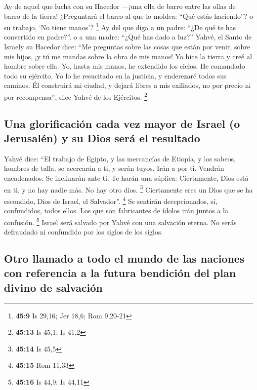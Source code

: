 \begin{paracol}{2}
 Ay de aquel que lucha con su Hacedor ---¡una olla de
barro entre las ollas de barro de la tierra! ¿Preguntará el barro al que
lo moldea: ``Qué estás haciendo''? o su trabajo, `No tiene manos'?
\footnote{\textbf{45:9} Is 29,16; Jer 18,6; Rom 9,20-21} 
Ay del que diga a un padre: ``¿De qué te has convertido en padre?''. o a
una madre: ``¿Qué has dado a luz?''  Yahvé, el Santo de
Israely su Hacedor dice: ``Me preguntas sobre las cosas que están por
venir, sobre mis hijos, ¡y tú me mandas sobre la obra de mis manos!
 Yo hice la tierra y creé al hombre sobre ella. Yo, hasta
mis manos, he extendido los cielos. He comandado todo su ejército.
 Yo lo he resucitado en la justicia, y enderezaré todos
sus caminos. Él construirá mi ciudad, y dejará libres a mis exiliados,
no por precio ni por recompensa'', dice Yahvé de los Ejércitos.
\footnote{\textbf{45:13} Is 45,1; Is 41,2}

\hypertarget{una-glorificaciuxf3n-cada-vez-mayor-de-israel-o-jerusaluxe9n-y-su-dios-seruxe1-el-resultado}{%
\subsection{Una glorificación cada vez mayor de Israel (o Jerusalén) y
su Dios será el
resultado}\label{una-glorificaciuxf3n-cada-vez-mayor-de-israel-o-jerusaluxe9n-y-su-dios-seruxe1-el-resultado}}

 Yahvé dice: ``El trabajo de Egipto, y las mercancías de
Etiopía, y los sabeos, hombres de talla, se acercarán a ti, y serán
tuyos. Irán a por ti. Vendrán encadenados. Se inclinarán ante ti. Te
harán una súplica: Ciertamente, Dios está en ti, y no hay nadie más. No
hay otro dios. \footnote{\textbf{45:14} Is 45,5} 
Ciertamente eres un Dios que se ha escondido, Dios de Israel, el
Salvador''. \footnote{\textbf{45:15} Rom 11,33}  Se
sentirán decepcionados, sí, confundidos, todos ellos. Los que son
fabricantes de ídolos irán juntos a la confusión. \footnote{\textbf{45:16}
  Is 44,9; Is 44,11}  Israel será salvado por Yahvé con
una salvación eterna. No serás defraudado ni confundido por los siglos
de los siglos.

\hypertarget{otro-llamado-a-todo-el-mundo-de-las-naciones-con-referencia-a-la-futura-bendiciuxf3n-del-plan-divino-de-salvaciuxf3n}{%
\subsection{Otro llamado a todo el mundo de las naciones con referencia
a la futura bendición del plan divino de
salvación}\label{otro-llamado-a-todo-el-mundo-de-las-naciones-con-referencia-a-la-futura-bendiciuxf3n-del-plan-divino-de-salvaciuxf3n}}


\end{paracol}
